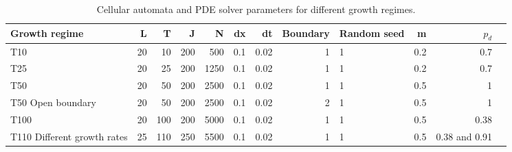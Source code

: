\begin{table}[H]
    \centering
    \begin{adjustbox}{center}

        \begin{tabular}{lrrrrrrrlrrl}
        \toprule
        \textbf{Growth regime} & \textbf{L} & \textbf{T} & \textbf{J} & \textbf{N} & \textbf{dx} & \textbf{dt} & \textbf{Boundary}  & \textbf{Random seed} & \textbf{m} & \textbf{$p_{d}$} \\
        \midrule
        T10 & 20 & 10 & 200 & 500 & 0.1 & 0.02 & 1  & 1 & 0.2 & 0.7 \\
        T25 & 20 & 25 & 200 & 1250 & 0.1 & 0.02 & 1  & 1 & 0.2 & 0.7 \\
        T50 & 20 & 50 & 200 & 2500 & 0.1 & 0.02 & 1  & 1 & 0.5 & 1 \\
        T50 Open boundary & 20 & 50 & 200 & 2500 & 0.1 & 0.02 & 2  & 1 & 0.5 & 1 \\
        T100 & 20 & 100 & 200 & 5000 & 0.1 & 0.02 & 1  & 1 & 0.5 & 0.38 \\
        T110 Different growth rates & 25 & 110 & 250 & 5500 & 0.1 & 0.02 & 1 & 1 & 0.5 & 0.38 and 0.91 \\
        \bottomrule
    \end{tabular}
        \end{adjustbox}

    \caption{Cellular automata and PDE solver parameters for different growth regimes.}
    \label{tab:numerical_param_table}
\end{table}

